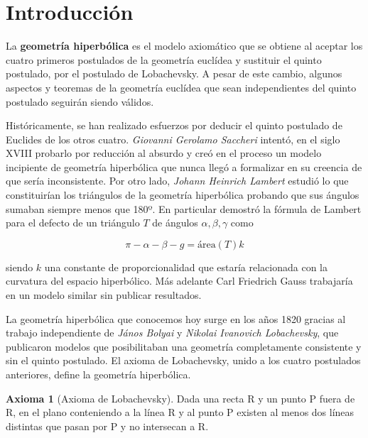 \documentclass{article}
\theoremstyle{plain}
\theoremstyle{definition}
\newtheorem*{axiom}{Axioma}
\theoremstyle{remark}
\begin{document}
\maketitle

\newpage
\tableofcontents
\newpage

\section{Introducción}

La \textbf{geometría hiperbólica} es el modelo axiomático que se
obtiene al aceptar los cuatro primeros postulados de la geometría
euclídea y sustituir el quinto postulado, por el postulado de
Lobachevsky. A pesar de este cambio, algunos aspectos y teoremas
de la geometría euclídea que sean independientes del quinto postulado
seguirán siendo válidos.

Históricamente, se han realizado esfuerzos por deducir el quinto
postulado de Euclides de los otros cuatro. \textit{Giovanni Gerolamo
  Saccheri} intentó, en el siglo XVIII probarlo por reducción al
absurdo y creó en el proceso un modelo incipiente de geometría
hiperbólica que nunca llegó a formalizar en su creencia de que sería
inconsistente. Por otro lado, \textit{Johann Heinrich Lambert} estudió
lo que constituirían los triángulos de la geometría hiperbólica probando
que sus ángulos sumaban siempre menos que 180º. En particular demostró
la fórmula de Lambert para el defecto de un triángulo $T$ de ángulos
$\alpha,\beta,\gamma$ como

\[
  \pi - \alpha- \beta - g = \mathrm{área}(T)k
\]

siendo $k$ una constante de proporcionalidad que estaría relacionada
con la curvatura del espacio hiperbólico. Más adelante Carl Friedrich
Gauss trabajaría en un modelo similar sin publicar resultados.

La geometría hiperbólica que conocemos hoy surge en los años 1820
gracias al trabajo independiente de \textit{János Bolyai} y
\textit{Nikolai Ivanovich Lobachevsky}, que publicaron modelos que
posibilitaban una geometría completamente consistente y sin el quinto
postulado. El axioma de Lobachevsky, unido a los cuatro postulados
anteriores, define la geometría hiperbólica.

\begin{axiom}[Axioma de Lobachevsky]
  Dada una recta R y un punto P fuera de R, en el plano conteniendo a
  la línea R y al punto P existen al menos dos líneas distintas que pasan
  por P y no intersecan a R.
\end{axiom}
\end{document}
